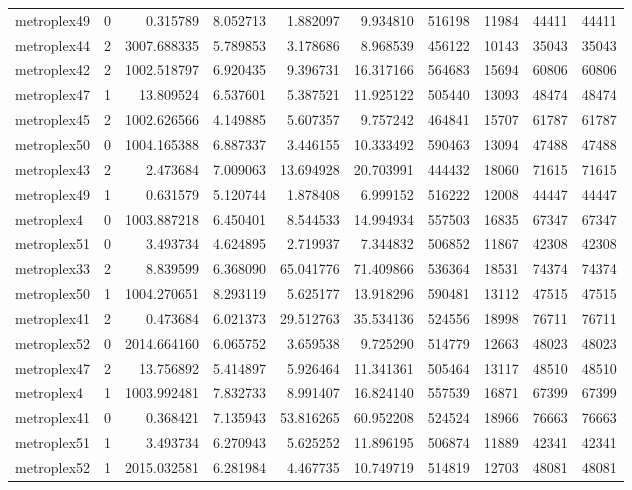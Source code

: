 \begin{longtable}{|l|r|r|r|r|r|r|r|r|r|}
metroplex49 & 0 & 0.315789 & 8.052713 & 1.882097 & 9.934810 & 516198 & 11984 & 44411 & 44411 \\
metroplex44 & 2 & 3007.688335 & 5.789853 & 3.178686 & 8.968539 & 456122 & 10143 & 35043 & 35043 \\
metroplex42 & 2 & 1002.518797 & 6.920435 & 9.396731 & 16.317166 & 564683 & 15694 & 60806 & 60806 \\
metroplex47 & 1 & 13.809524 & 6.537601 & 5.387521 & 11.925122 & 505440 & 13093 & 48474 & 48474 \\
metroplex45 & 2 & 1002.626566 & 4.149885 & 5.607357 & 9.757242 & 464841 & 15707 & 61787 & 61787 \\
metroplex50 & 0 & 1004.165388 & 6.887337 & 3.446155 & 10.333492 & 590463 & 13094 & 47488 & 47488 \\
metroplex43 & 2 & 2.473684 & 7.009063 & 13.694928 & 20.703991 & 444432 & 18060 & 71615 & 71615 \\
metroplex49 & 1 & 0.631579 & 5.120744 & 1.878408 & 6.999152 & 516222 & 12008 & 44447 & 44447 \\
metroplex4 & 0 & 1003.887218 & 6.450401 & 8.544533 & 14.994934 & 557503 & 16835 & 67347 & 67347 \\
metroplex51 & 0 & 3.493734 & 4.624895 & 2.719937 & 7.344832 & 506852 & 11867 & 42308 & 42308 \\
metroplex33 & 2 & 8.839599 & 6.368090 & 65.041776 & 71.409866 & 536364 & 18531 & 74374 & 74374 \\
metroplex50 & 1 & 1004.270651 & 8.293119 & 5.625177 & 13.918296 & 590481 & 13112 & 47515 & 47515 \\
metroplex41 & 2 & 0.473684 & 6.021373 & 29.512763 & 35.534136 & 524556 & 18998 & 76711 & 76711 \\
metroplex52 & 0 & 2014.664160 & 6.065752 & 3.659538 & 9.725290 & 514779 & 12663 & 48023 & 48023 \\
metroplex47 & 2 & 13.756892 & 5.414897 & 5.926464 & 11.341361 & 505464 & 13117 & 48510 & 48510 \\
metroplex4 & 1 & 1003.992481 & 7.832733 & 8.991407 & 16.824140 & 557539 & 16871 & 67399 & 67399 \\
metroplex41 & 0 & 0.368421 & 7.135943 & 53.816265 & 60.952208 & 524524 & 18966 & 76663 & 76663 \\
metroplex51 & 1 & 3.493734 & 6.270943 & 5.625252 & 11.896195 & 506874 & 11889 & 42341 & 42341 \\
metroplex52 & 1 & 2015.032581 & 6.281984 & 4.467735 & 10.749719 & 514819 & 12703 & 48081 & 48081 \\

\end{longtable}
